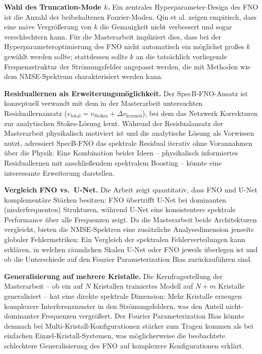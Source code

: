 \documentclass[a4paper,12pt]{article}
\begin{document}
\textbf{Wahl des Truncation-Mode $k$.}
Ein zentrales Hyperparameter-Design des FNO ist die Anzahl der beibehaltenen Fourier-Moden.
Qin et al. zeigen empirisch, dass eine naive Vergr\"o\ss{}erung von $k$ die Genauigkeit nicht
verbessert und sogar verschlechtern kann. F\"ur die Masterarbeit impliziert dies, dass bei
der Hyperparameteroptimierung des FNO nicht automatisch ein m\"oglichst gro\ss{}es $k$ gew\"ahlt
werden sollte; stattdessen sollte $k$ an die tats\"achlich vorliegende Frequenzstruktur der
Str\"omungsfelder angepasst werden, die mit Methoden wie dem NMSE-Spektrum charakterisiert
werden kann.

\textbf{Residuallernen als Erweiterungsm\"oglichkeit.}
Der SpecB-FNO-Ansatz ist konzeptuell verwandt mit dem in der Masterarbeit untersuchten
Residuallernansatz ($v_{\text{total}} = v_{\text{Stokes}} + \Delta v_{\text{learned}}$),
bei dem das Netzwerk Korrekturen zur analytischen Stokes-L\"osung lernt. W\"ahrend der
Residualansatz der Masterarbeit physikalisch motiviert ist und die analytische L\"osung als
Vorwissen nutzt, adressiert SpecB-FNO das spektrale Residual iterativ ohne Vorannahmen
\"uber die Physik. Eine Kombination beider Ideen -- physikalisch informiertes Residuallernen
mit anschlie\ss{}endem spektralem Boosting -- k\"onnte eine interessante Erweiterung darstellen.

\textbf{Vergleich FNO vs.\ U-Net.}
Die Arbeit zeigt quantitativ, dass FNO und U-Net komplementäre St\"arken besitzen: FNO
\"ubertrifft U-Net bei dominanten (niederfrequenten) Strukturen, w\"ahrend U-Net eine
konsistentere spektrale Performance \"uber alle Frequenzen zeigt. Da die Masterarbeit
beide Architekturen vergleicht, bieten die NMSE-Spektren eine zus\"atzliche Analysedimension
jenseits globaler Fehlermetriken: Ein Vergleich der spektralen Fehlerverteilungen kann
erkl\"aren, in welchen r\"aumlichen Skalen U-Net oder FNO jeweils \"uberlegen ist und ob die
Unterschiede auf den Fourier Parameterization Bias zur\"uckzuf\"uhren sind.

\textbf{Generalisierung auf mehrere Kristalle.}
Die Kernfragestellung der Masterarbeit -- ob ein auf $N$ Kristallen trainiertes Modell auf
$N{+}m$ Kristalle generalisiert -- hat eine direkte spektrale Dimension: Mehr Kristalle
erzeugen komplexere Interferenzmuster in den Str\"omungsfeldern, was den Anteil
nicht-dominanter Frequenzen vergr\"o\ss{}ert. Der Fourier Parameterization Bias k\"onnte
demnach bei Multi-Kristall-Konfigurationen st\"arker zum Tragen kommen als bei einfachen
Einzel-Kristall-Systemen, was m\"oglicherweise die beobachtete schlechtere Generalisierung
des FNO auf komplexere Konfigurationen erkl\"art.
\end{document}
